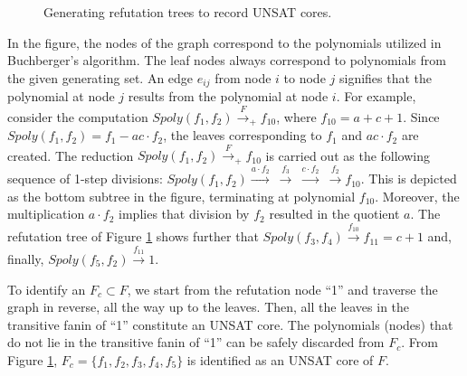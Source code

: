 \begin{figure}[bp]
\caption{Generating refutation trees to record UNSAT cores.}
\label{fig:refute}
\end{figure}

In the figure, the nodes of the graph correspond to the polynomials
utilized in Buchberger's algorithm. The leaf nodes always correspond
to polynomials from the given generating set. An edge $e_{ij}$ from
node $i$ to node $j$ signifies that the polynomial at node $j$ results
from the polynomial at node $i$. For example, consider the computation
$Spoly(f_1,f_2)\xrightarrow{F}_+ f_{10}$, where $f_{10} = a + c +
1$. Since $Spoly(f_1, f_2) = f_1 - ac\cdot f_2$, the leaves
corresponding to $f_1$ and $ac\cdot f_2$ are created. The reduction
$Spoly(f_1,f_2)\xrightarrow{F}_+ f_{10}$ is carried out as the
following sequence of 1-step divisions:
$Spoly(f_1,f_2)\xrightarrow{a\cdot f_2} ~\xrightarrow{f_3}~
\xrightarrow{c\cdot f_2}  ~\xrightarrow{f_2} f_{10}$. This is depicted
as the bottom subtree in the figure, terminating at polynomial
$f_{10}$. Moreover, the multiplication $a\cdot f_2$ implies that
division by $f_2$ resulted in the quotient $a$. The refutation tree of
Figure  \ref{fig:refute} shows further that
$Spoly(f_3,f_4)\xrightarrow{f_{10}} f_{11} = c+1$ and, finally,
$Spoly(f_5,f_2)\xrightarrow{f_{11}} 1$. 
 
To identify an $F_c \subset F$, we start from the refutation node
``1'' and traverse the graph in reverse, all the way up to the
leaves. Then, all the leaves in the transitive fanin of ``1''
constitute an UNSAT core. The polynomials (nodes) that do not lie in
the transitive fanin of ``1'' can be safely discarded from $F_c$. From
Figure \ref{fig:refute}, $F_c = \{f_1,f_2,f_3,f_4,f_5\}$ is identified
as an UNSAT core of $F$. 

